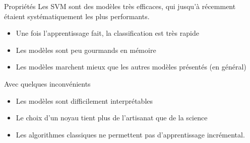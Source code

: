 \documentclass[../allslides.tex]{subfiles}
\begin{document}
\begin{frame}{Propriétés}
    Les SVM sont des modèles très efficaces, qui jusqu'à récemment étaient systématiquement les plus performants.
    \begin{itemize}
        \item Une fois l'apprentissage fait, la classification est très rapide
        \item Les modèles sont peu gourmands en mémoire
        \item Les modèles marchent mieux que les autres modèles présentés (en général)
    \end{itemize}
    Avec quelques inconvénients
    \begin{itemize}
        \item Les modèles sont difficilement interprétables
        \item Le choix d'un noyau tient plus de l'artisanat que de la science
        \item Les algorithmes classiques ne permettent pas d'apprentissage incrémental.
    \end{itemize}
\end{frame}

\end{document}
